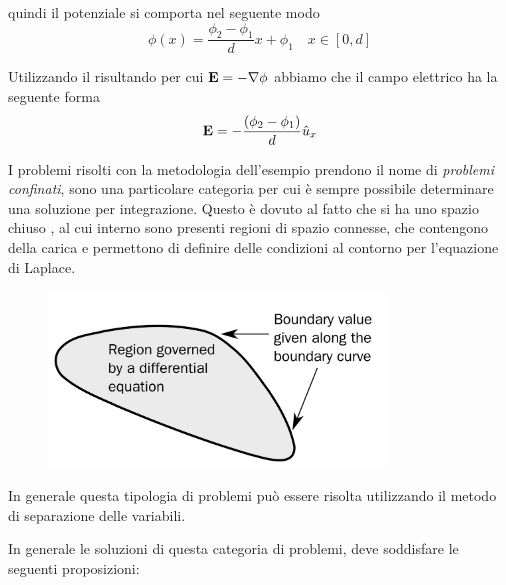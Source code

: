 quindi il potenziale si comporta nel seguente modo
\begin{equation*}
	\phi(x) = \frac{\phi_2 -\phi_1}{d}x + \phi_1 \quad x \in [0,d]
\end{equation*}

Utilizzando il risultando per cui $\bold{E} = - \nabla  \phi $ abbiamo che il campo elettrico ha la seguente forma 
\begin{equation*}
	\bold{E} = -\frac{(\phi_2 -\phi_1)}{d}\hat{u}_x
\end{equation*}

\noindent I problemi risolti con la metodologia dell'esempio prendono il nome di \textit{problemi confinati}, sono una particolare categoria per cui \`e sempre possibile determinare una soluzione per integrazione. Questo \`e dovuto al fatto che si ha uno spazio chiuso , al cui interno sono presenti regioni di spazio connesse, che contengono della carica e permettono di definire delle condizioni al contorno per l'equazione di Laplace.
\begin{figure}[!ht]
\includegraphics[width = 9cm]{images/boundaryproblem}
\centering
\end{figure}  

\noindent In generale questa tipologia di problemi pu\`o essere risolta utilizzando il metodo di separazione delle variabili.

In generale le soluzioni di questa categoria di problemi, deve soddisfare le seguenti proposizioni:

